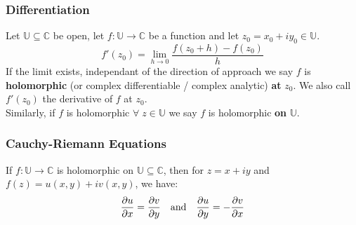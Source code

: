 \documentclass[a4paper, 10pt]{article}
\begin{document}
\subsubsection{Differentiation}
\begin{definitionbox}
  Let $\mathbb{U} \subseteq \mathbb{C}$ be open, let $f: \mathbb{U} \to \mathbb{C}$ be a function and let $z_0 = x_0 + iy_0 \in \mathbb{U}$.
  $$f'(z_0) = \lim_{h \to 0} \frac{f(z_0 + h) - f(z_0)}{h}$$
  If the limit exists, independant of the direction of approach we say $f$ is \textbf{holomorphic} (or complex differentiable / complex analytic) \textbf{at} $z_0$.
  We also call $f'(z_0)$ the derivative of $f$ at $z_0$. \\
  Similarly, if $f$ is holomorphic $\forall \; z \in \mathbb{U}$ we say $f$ is holomorphic \textbf{on} $\mathbb{U}$.
\end{definitionbox}


\subsubsection{Cauchy-Riemann Equations}
\begin{theorembox}
  If $f:\mathbb{U} \to \mathbb{C}$ is holomorphic on $\mathbb{U} \subseteq \mathbb{C}$, then for $z = x + iy$ and $f(z) = u(x,y) + iv(x,y)$, we have:
  $$\frac{\partial u}{\partial x} = \frac{\partial v}{\partial y} \quad  \text{and} \quad \frac{\partial u}{\partial y} = - \frac{\partial v}{\partial x}$$
\end{theorembox}

\pagebreak
\end{document}
